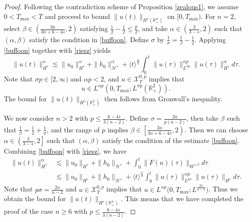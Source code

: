 \documentclass[preprint,compress,12pt]{elsarticle}
\numberwithin{equation}{section}
\begin{document}
\begin{proof}
	Following the contradiction scheme of Proposition \ref{zealous1}, we assume $0<T_{\max}<T$ and proceed to bound $\|u(t)\|_{H^{s}(\mathbb{R}^{n}_{+})}$ on $[0,T_{\max})$. For $n=2$, select $\beta\in \left(\frac{3n}{3n+6-4s},2\right)$ satisfying $\frac{1}{\beta}-\frac{1}{2}\leq \frac{p}{2}$, and take $\alpha\in\left(\frac{3}{3-s},2\right)$ such that $(\alpha,\beta)$ satisfy the condition in \eqref{buffoon}. Define $\sigma$ by $\frac{1}{\sigma}=\frac{1}{\beta}-\frac{1}{2}$. Applying \eqref{buffoon} together with \eqref{riesz} yields
	\begin{equation}
		\|u(t)\|_{H^{s}}^{\alpha}\lesssim \|u_{0}\|_{H^{s}}^{\alpha}+\|h_{0}\|_{\mathcal{H}^{s}}^{\alpha}+ \langle t\rangle^{\frac{\alpha}{3}}\int_{0}^{t} \|u(\tau)\|_{L^{\sigma p}}^{\alpha p} \|u(\tau)\|_{H^{s}}^{\alpha}  d\tau.
	\end{equation}
	Note that $\sigma p\in[2,\infty)$ and $\alpha p<2$, and $u\in\mathscr{X}^{0,p}_{T}$ implies that $$u\in L^{\alpha p}(0,T_{\max};L^{\sigma p}(\mathbb{R}^{2}_{+})).$$ The bound for  $\|u(t)\|_{H^{s}(\mathbb{R}^{2}_{+})}$ then follows from Gronwall's inequality.
	
	We now consider $n>2$ with  $p\leq\frac{6-4s}{3(n-2)}$. Define $\sigma=\frac{2n}{p(n-2)}$, then take  $\beta$ such that $\frac{1}{\beta}=\frac{1}{2}+\frac{1}{\sigma}$, and the range of $p$ implies  $\beta\in \left[\frac{3n}{3n+6-4s},2\right)$.  Then we can choose  $\alpha\in\left(\frac{3}{3-s},2\right]$ such that $(\alpha,\beta)$ satisfy the condition of the estimate \eqref{buffoon}. Combining \eqref{buffoon} with \eqref{riesz}, we have
	\begin{equation}
		\begin{aligned}
			\|u(t)\|_{H^{s}}^{\alpha}&\lesssim \|u_{0}\|_{H^{s}}+\|h_{0}\|_{\mathcal{H}^{s}}+ \int_{0}^{t} \|F(u)(\tau)\|_{W^{s,\beta}}  d\tau\\& \lesssim  \|u_{0}\|_{H^{s}}+\|h_{0}\|_{\mathcal{H}^{s}}+ \langle t\rangle^{\frac{\alpha}{3}}\int_{0}^{t} \|u(\tau)\|_{L^{p\sigma}}^{\alpha p} \|u(\tau)\|_{H^{s}}  d\tau.
		\end{aligned}
	\end{equation}
	Note that $p\sigma=\frac{2n}{n-2}$ and $u\in\mathscr{X}^{0,p}_{T}$ implies that $u\in L^{\alpha p}\big(0,T_{\max};L^{\frac{2n}{n-2}}\big)$. Thus we obtain the bound for $\|u(t)\|_{H^{s}(\mathbb{R}^{n}_{+})}$.    This means that we have completed the proof of the case $n\geq6$ with $p\leq \frac{6-4s}{3(n-2)}$.


\end{proof}
\end{document}
